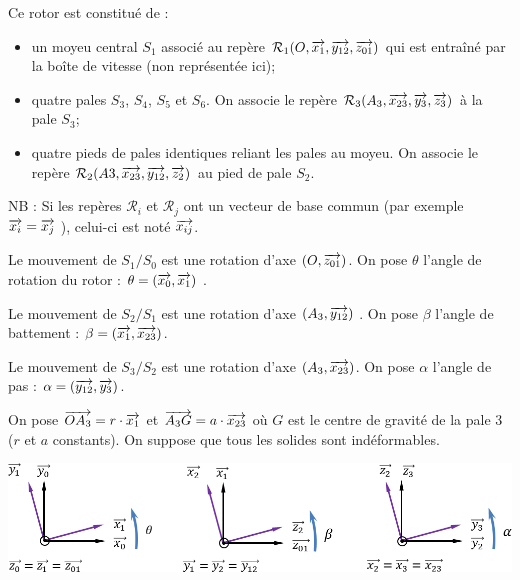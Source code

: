 \documentclass[10pt,fleqn]{article} %
\begin{document}
\begin{multicols}{2}
\begin{multicols}{2}
Ce rotor est constitué de :
\begin{itemize}
\item un moyeu central $S_1$ associé au repère $\mathcal{R}_1(O,\overrightarrow{x_1},\overrightarrow{y_{12}},\overrightarrow{z_{01}})$ qui est entraîné par la boîte de vitesse (non
représentée ici);
\item quatre pales $S_3$, $S_4$, $S_5$ et $S_6$. On associe le repère $\mathcal{R}_3(A_3,\overrightarrow{x_{23}},\overrightarrow{y_3},\overrightarrow{z_3} )$ à la pale $S_3$;
\item quatre pieds de pales identiques reliant les pales au moyeu. On associe le repère
$\mathcal{R}_2(A3,\overrightarrow{x_{23}},\overrightarrow{y_{12}},\overrightarrow{z_2} )$ au pied de pale $S_2$.
\end{itemize}

NB : Si les repères $\mathcal{R}_i$ et $\mathcal{R}_j$ ont un vecteur de base commun (par exemple $\overrightarrow{x_i}= \overrightarrow{x_j}$ ), celui-ci est noté $\overrightarrow{x_{ij}}$.


Le mouvement de $S_1/S_0$ est une rotation d'axe $(O,\overrightarrow{z_{01}})$. On pose $\theta$ l’angle de rotation du rotor : $\theta = (\overrightarrow{x_0},\overrightarrow{x_1})$ .

Le mouvement de $S_2/S_1$ est une rotation d'axe $(A_3,\overrightarrow{y_{12}})$ . On pose $\beta$ l’angle de battement : $\beta = (\overrightarrow{x_1},\overrightarrow{x_{23}})$.

Le mouvement de $S_3/S_2$ est une rotation d'axe $(A_3,\overrightarrow{x_{23}})$. On pose $\alpha$ l’angle de pas : $\alpha = (\overrightarrow{y_{12}},\overrightarrow{y_3})$.

On pose $\overrightarrow{OA_3} = r\cdot \overrightarrow{x_1}$ et $\overrightarrow{A_3G}=a\cdot \overrightarrow{x_{23}}$ où $G$ est le centre de gravité de la pale 3 ($r$ et $a$ constants). On suppose que tous les solides sont indéformables.


\begin{center}
\includegraphics[width=.9\linewidth]{images/cor1}
\end{center}

\fi


\end{multicols}
\end{multicols}
\end{document}
